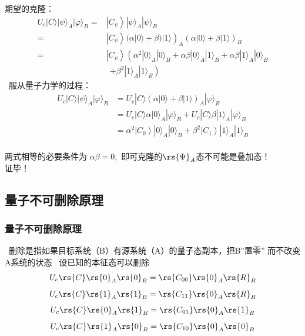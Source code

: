 \begin{frame}
    \frametitle{}
    期望的克隆：
    \[\begin{aligned}
        U_{c}|C\rangle|\psi\rangle_{A}|\varphi\rangle_{B}=&\left|C_{\psi}\right\rangle|\psi\rangle_{A}|\psi\rangle_{B} \\
        =&\left.\left|C_{\psi}\right\rangle(\alpha|0\rangle+\beta)|1\rangle\right)_{A}(\alpha|0\rangle+\beta|1\rangle)_{B} \\
        =&\left|C_{\psi}\right\rangle\left(\alpha^{2}|0\rangle_{A}|0\rangle_{B}+\alpha \beta|0\rangle_{A}|1\rangle_{B}+\alpha \beta|1\rangle_{A}|0\rangle_{B}\right.\\
        &~~\left.+\beta^{2}|1\rangle_{A}|1\rangle_{B}\right)
        \end{aligned} 
    \]
     服从量子力学的过程：
    \[ \begin{aligned}
        U_{c}|C\rangle|\psi\rangle_{A}|\varphi\rangle_{B} &=U_{c}|C\rangle\left(\alpha|0\rangle+\beta|1\rangle\right)_{A}|\varphi\rangle_{B} \\
        &=U_{c}|C\rangle \alpha|0\rangle_{A}|\varphi\rangle_{B}+U_{c}|C\rangle \beta|1\rangle_{A}|\varphi\rangle_{B} \\
        &=\alpha^{2}\left|C_{0}\right\rangle|0\rangle_{A}|0\rangle_{B}+\beta^{2}\left|C_{1}\right\rangle|1\rangle_{A}|1\rangle_{B}
        \end{aligned}
    \]
    ~~\\
    两式相等的必要条件为 $\alpha\beta=0$, 即可克隆的$\rs{\Psi}_A$态不可能是叠加态！\\
    证毕！          
\end{frame}

\subsection{量子不可删除原理}
\begin{frame}
    \frametitle{量子不可删除原理}
    {\Bullet}~删除是指如果目标系统（B）有源系统（A）的量子态副本，把B”置零” 而不改变A系统的状态
    \例[2.试证明未知量子态不可删除]{}
    \证~设已知的本征态可以删除
    \[ U_c\rs{C}\rs{0}_A\rs{0}_B=\rs{C_{00}}\rs{0}_A\rs{R}_B\]
    \[ U_c\rs{C}\rs{1}_A\rs{1}_B=\rs{C_{11}}\rs{0}_A\rs{R}_B\]
    \[ U_c\rs{C}\rs{0}_A\rs{1}_B=\rs{C_{01}}\rs{0}_A\rs{1}_B\]
    \[ U_c\rs{C}\rs{1}_A\rs{0}_B=\rs{C_{10}}\rs{0}_A\rs{0}_B\]
\end{frame}


